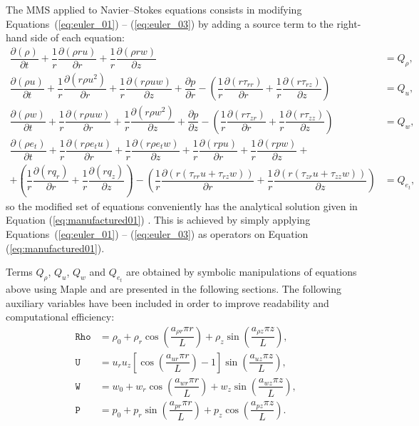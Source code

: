\documentclass[10pt]{article}
\newcommand{\Diff}[2] {\dfrac{\partial( #1)}{\partial #2}}
\newcommand{\diff}[2] {\dfrac{\partial #1}{\partial #2}}
\newcommand{\Rho}{\,\mathtt{Rho}}
\newcommand{\PP}{\,\mathtt{P}}
\newcommand{\U}{\,\mathtt{U}}
\newcommand{\W}{\,\mathtt{W}}
\begin{document}
The MMS applied to Navier--Stokes equations consists in modifying Equations~(\ref{eq:euler_01}) -- (\ref{eq:euler_03}) by adding a source term to the right-hand side of each equation:
\begin{equation}
 \label{eq:ns2d_mod}
\begin{split}
  \Diff{\rho}{t}+ \dfrac{1}{r} \Diff{\rho r u}{r}+ \dfrac{1}{r}\Diff{\rho r w}{z} &=Q_\rho,\\
%
\Diff{\rho u}{t} +\dfrac{1}{r}\Diff{r \rho u^2 }{r}+ \dfrac{1}{r}\Diff{r \rho u w }{z}+\diff{p}{r}-\left(\dfrac{1}{r}\Diff{r \tau_{rr}}{r}+\dfrac{1}{r}\Diff{r \tau_{rz}}{z}\right) &= Q_u,\\
%
\Diff{\rho w}{t} + \dfrac{1}{r}\Diff{r \rho  u w}{r}+ \dfrac{1}{r}\Diff{r \rho w^2 }{z}+\diff{p}{z}- \left(\dfrac{1}{r}\Diff{r \tau_{zr}}{r}+\dfrac{1}{r}\Diff{r \tau_{zz}}{z}\right) &= Q_w,\\
%
\Diff{\rho e_t}{ t}+\dfrac{1}{r}\Diff{r \rho e_t u}{ r}+\dfrac{1}{r}\Diff{r \rho e_t w}{z} +\dfrac{1}{r}\Diff{r p  u}{ r}+\dfrac{1}{r}\Diff{r p w}{z}+&\\
+\left(\dfrac{1}{r}\Diff{r q_r }{r} + \dfrac{1}{r}\Diff{r q_z }{z}\right) -\left(\dfrac{1}{r}\Diff{r( \tau_{rr} u + \tau_{rz} w ) }{r} + \dfrac{1}{r}\Diff{ r(\tau_{zr} u + \tau_{zz} w ) }{z}\right) &=Q_{e_t},
\end{split}
\end{equation}
%
%
so the modified set of equations conveniently has the analytical solution given in Equation (\ref{eq:manufactured01}) \cite{Roy2002}. This is achieved by simply applying Equations~(\ref{eq:euler_01}) -- (\ref{eq:euler_03}) as operators on Equation (\ref{eq:manufactured01}).

Terms $Q_\rho$, $Q_u$,  $Q_w$ and $Q_{e_t}$ are obtained by symbolic manipulations of equations above using Maple and are presented in the following sections. The following auxiliary variables have been included in order to improve readability and computational efficiency:
\begin{equation*}
 \begin{split}
\label{eq:aux_}
\Rho &= \rho_0+\rho_r \cos\left(\dfrac{a_{\rho r} \pi r}{L}\right)+\rho_z \sin\left(\dfrac{a_{\rho z} \pi z}{L}\right),\\
\U &= u_r u_z \left[\cos\left(\dfrac{a_{ur} \pi r}{L}\right)-1\right]\sin\left(\dfrac{a_{uz} \pi z}{L}\right),\\
\W &=w_0+w_r \cos\left(\dfrac{a_{w r} \pi r}{L}\right)+w_z \sin\left(\dfrac{a_{w z} \pi z}{L}\right),\\
\PP &=p_0+p_r \sin\left(\dfrac{a_{p r} \pi r}{L}\right)+p_z \cos\left(\dfrac{a_{p z} \pi z}{L}\right).
\end{split}
\end{equation*}
\end{document}
